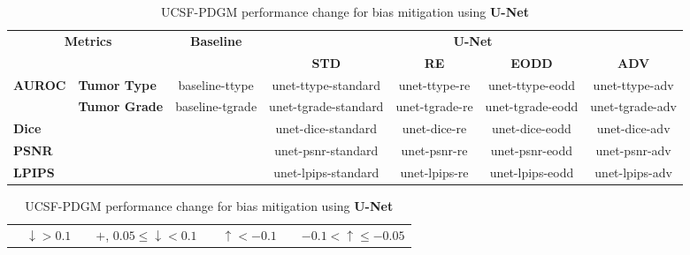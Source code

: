 \begin{table}[]
    \centering
    \caption{UCSF-PDGM performance change for bias mitigation using \textbf{U-Net}}
    \label{tab:ucsf_perf_unet}
    \begin{tabular}{ll|c|cccc}
    \hline
    \multicolumn{2}{c|}{\multirow{2}{*}{\textbf{Metrics}}} 
    & \multirow{2}{*}{\textbf{Baseline}} 
    & \multicolumn{4}{c}{\textbf{U-Net}} \\
    \cline{4-7}
    \multicolumn{2}{c|}{} 
    & 
    & \textbf{STD} & \textbf{RE} & \textbf{EODD} & \textbf{ADV} \\
    \hline

    \multirow{2}{*}{\textbf{AUROC}} 
    & \textbf{Tumor Type} & baseline-ttype & unet-ttype-standard & unet-ttype-re & unet-ttype-eodd & unet-ttype-adv \\
    & \textbf{Tumor Grade} & baseline-tgrade & unet-tgrade-standard & unet-tgrade-re & unet-tgrade-eodd & unet-tgrade-adv \\
    \cline{1-2}

    \multicolumn{2}{l|}{\textbf{Dice}} & \cellcolor[HTML]{C0C0C0} 
    & unet-dice-standard & unet-dice-re & unet-dice-eodd & unet-dice-adv \\
    \cline{1-2}

    \multicolumn{2}{l|}{\textbf{PSNR}} & \cellcolor[HTML]{C0C0C0} 
    & unet-psnr-standard & unet-psnr-re & unet-psnr-eodd & unet-psnr-adv \\
    \cline{1-2}

    \multicolumn{2}{l|}{\textbf{LPIPS}} & \cellcolor[HTML]{C0C0C0} 
    & unet-lpips-standard & unet-lpips-re & unet-lpips-eodd & unet-lpips-adv \\
    \hline
    \end{tabular}

    \begin{tabular}{llllllll} 
        \cellcolor[HTML]{E6C321} & $ \downarrow > 0.1$ & 
        \cellcolor[HTML]{F1D892} &$+$, $0.05 \leq \downarrow < 0.1$ & 
        \cellcolor[HTML]{3089A2} & $\uparrow < -0.1$  & 
        \cellcolor[HTML]{93C1C9} & $-0.1 < \uparrow \leq -0.05$ \\
    \end{tabular}
\end{table}


